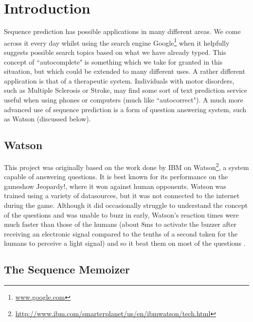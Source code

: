\chapter{Introduction}


Sequence prediction has possible applications in many different areas. We come across it every day whilst using the search engine Google\footnote{\url{www.google.com}} when it helpfully suggests possible search topics based on what we have already typed. This concept of ``autocomplete" is something which we take for granted in this situation, but which could be extended to many different uses. A rather different application is that of a therapeutic system. Individuals with motor disorders, such as Multiple Sclerosis or Stroke, may find some sort of text prediction service useful when using phones or computers (much like ``autocorrect"). A much more advanced use of sequence prediction is a form of question answering system, such as Watson (discussed below).

\section{Watson}

This project was originally based on the work done by IBM on Watson\footnote{\url{http://www.ibm.com/smarterplanet/us/en/ibmwatson/tech.html}}, a system capable of answering questions. It is best known for its performance on the gameshow Jeopardy!, where it won against human opponents. Watson was trained using a variety of datasources, but it was not connected to the internet during the game. Although it did occasionally struggle to understand the concept of the questions and was unable to buzz in early, Watson's reaction times were much faster than those of the humans (about 8ms to activate the buzzer after receiving an electronic signal compared to the tenths of a second taken for the humans to perceive a light signal) and so it beat them on most of the questions \cite{wiki_watson}.

\section{The Sequence Memoizer}


